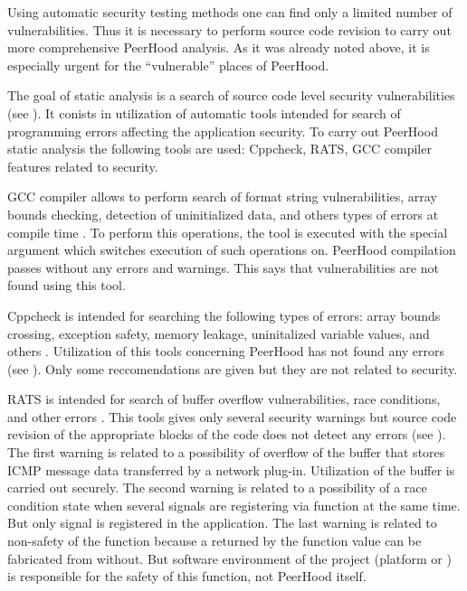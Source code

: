 %
Using automatic security testing methods one can find only a limited number of vulnerabilities. 
%
Thus it is necessary to perform source code revision to carry out more comprehensive PeerHood analysis. 
%
As it was already noted above, it is especially urgent for the ``vulnerable'' places of PeerHood. 



%
The goal of static analysis is a search of source code level security vulnerabilities (see ). 
%
It conists in utilization of automatic tools intended for search of programming errors affecting the application security. 
%
To carry out PeerHood static analysis the following tools are used: Cppcheck, RATS, GCC compiler features related to security. 

%
GCC compiler allows to perform search of format string vulnerabilities, array bounds checking, detection of uninitialized data, and others types of errors at compile time . 
%
To perform this operations, the tool is executed with the special  argument which switches execution of such operations on. 
%
PeerHood compilation passes without any errors and warnings. 
%
This says that vulnerabilities are not found using this tool. 

%
Cppcheck is intended for searching the following types of errors: array bounds crossing, exception safety, memory leakage, uninitalized variable values, and others . 
%
Utilization of this tools concerning PeerHood has not found any errors (see ). 
%
Only some reccomendations are given but they are not related to security. 

%
RATS is intended for search of buffer overflow vulnerabilities, race conditions, and other errors . 
%
This tools gives only several security warnings but source code revision of the appropriate blocks of the code does not detect any errors (see ). 
%
The first warning is related to a possibility of overflow of the buffer that stores ICMP message data transferred by a network plug-in. 
%
Utilization of the buffer is carried out securely. 
%
The second warning is related to a possibility of a race condition state when several signals are registering via  function at the same time. 
%
But only signal is registered in the application. 
%
The last warning is related to non-safety of the  function because a returned by the function value can be fabricated from without. 
%
But software environment of the project (platform or ) is responsible for the safety of this function, not PeerHood itself. 

